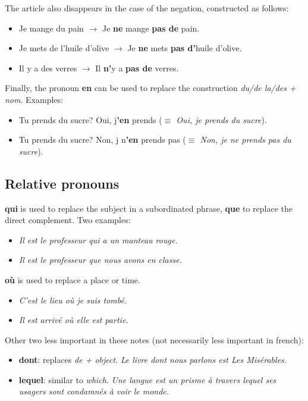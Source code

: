 \documentclass[palatino]{nicenotes}
\begin{document}
The article also disappears in the case of the negation, constructed as follows:

\begin{itemize}
\item Je mange du pain $\to$ Je \textbf{ne} mange \textbf{pas de} pain.
\item Je mets de l'huile d'olive $\to$ Je \textbf{ne} mets \textbf{pas d'}huile d'olive.
\item Il y a des verres $\to$ Il \textbf{n'}y a \textbf{pas de} verres.
\end{itemize}

Finally, the pronoun \textbf{en} can be used to replace the construction \textit{du/de la/des + nom}. Examples:

\begin{itemize}
\item Tu prends du sucre? Oui, j\textbf{'en} prends (\textit{$\equiv$ Oui, je prends du sucre}).
\item Tu prends du sucre? Non, j n\textbf{'en} prends pas (\textit{$\equiv$ Non, je ne prends pas du sucre}).
\end{itemize}

\subsection{Relative pronouns}

\textbf{qui} is used to replace the subject in a subordinated phrase, \textbf{que} to replace the direct complement. Two examples:

\begin{itemize}
\item \textit{Il est le professeur qui a un manteau rouge.}
\item \textit{Il est le professeur que nous avons en classe.}
\end{itemize}

\textbf{où} is used to replace a place or time.

\begin{itemize}
\item \textit{C'est le lieu où je suis tombé.}
\item \textit{Il est arrivé où elle est partie.}
\end{itemize}

Other two less important in these notes (not necessarily less important in french):

\begin{itemize}
\item \textbf{dont}: replaces \textit{de + object}. \textit{Le livre dont nous parlons est Les Misérables.}
\item \textbf{lequel}: similar to \textit{which}. \textit{Une langue est un prisme à travers lequel ses usagers sont condamnés à voir le monde.}
\end{itemize}
\end{document}
